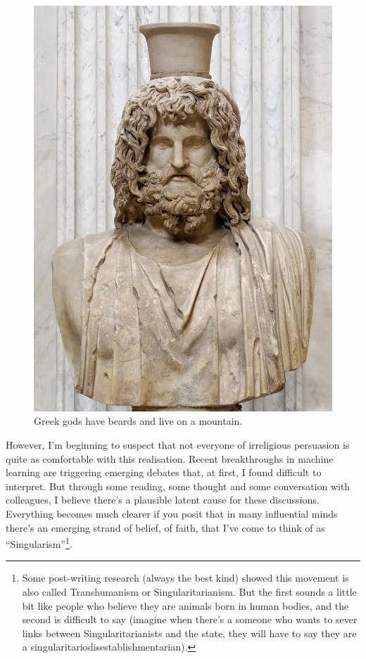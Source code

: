 \documentclass[a4paper]{caesar_book}
\begin{document}
\begin{figure}[htbp]%
	\includegraphics[width=\textwidth]{pictures/Serapis_Pio-Clementino.jpg}%
	\caption*{Greek gods have beards and live on a mountain.}%
	\label{greek-gods}%
\end{figure}%

However, I’m beginning to suspect that not everyone of irreligious persuasion is quite as comfortable with this realisation. Recent breakthroughs in machine learning are triggering emerging debates that, at first, I found difficult to interpret. But through some reading, some thought and some conversation with colleagues, I believe there’s a plausible latent cause for these discussions. Everything becomes much clearer if you posit that in many influential minds there’s an emerging strand of belief, of faith, that I’ve come to think of as “Singularism”\footnote{Some post-writing research (always the best kind) showed this movement is also called Transhumanism or Singularitarianism. But the first sounds a little bit like people who believe they are animals born in human bodies, and the second is difficult to say (imagine when there’s a someone who wants to sever links between Singularitarianists and the state, they will have to say they are a singularitariodisestablishmentarian).}.
\end{document}
